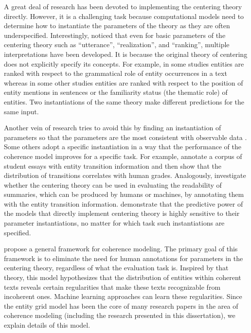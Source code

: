 A great deal of research has been devoted to implementing the centering theory \cite{miltsakaki00,karamanis04a} directly. 
However, it is a challenging task because computational models need to determine how to instantiate the parameters of the theory as they are often underspecified. 
Interestingly,  noticed that even for basic parameters of the centering theory such as ``utterance'', ``realization'', and ``ranking'', multiple interpretations have been developed.
It is because the original theory of centering does not explicitly specify its concepts. 
For example, in some studies entities are ranked with respect to the grammatical role of entity occurrences in a text \cite{brennan87,grosz95} whereas in some other studies entities are ranked with respect to the position of entity mentions in sentences \cite{prince81a} or the familiarity status (the thematic role) \cite{strube.cl99,moens08} of entities.  
Two instantiations of the same theory make different predictions for the same input. 

Another vein of research tries to avoid this by finding an instantiation of parameters so that the parameters are the most consistent with observable data \cite{strube.cl99,karamanis04a,poesio04b}. 
Some others adopt a specific instantiation in a way that the performance of the coherence model improves for a specific task. 
For example,  annotate a corpus of student essays with entity transition information and then show that the distribution of transitions correlates with human grades. 
Analogously,  investigate whether the centering theory can be used in evaluating the readability of summaries, which can be produced by humans or machines, by annotating them with the entity transition information. 
 demonstrate that the predictive power of the models that directly implement centering theory is highly sensitive to their parameter instantiations, no matter for which task such instantiations are specified. 

 propose a general framework for coherence modeling.  
The primary goal of this framework is to eliminate the need for human annotations for parameters in the centering theory, regardless of what the evaluation task is. 
Inspired by that theory, this model hypothesizes that the distribution of entities within coherent texts reveals certain regularities that make these texts recognizable from incoherent ones. 
Machine learning approaches can learn these regularities.  
Since the entity grid model has been the core of many research papers in the area of coherence modeling (including the research presented in this dissertation), we explain details of this model. 

